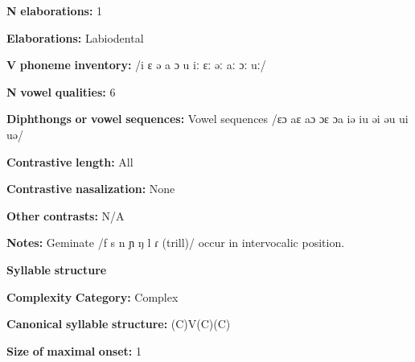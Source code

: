 \documentclass[output=paper]{langsci/langscibook}
\begin{document}
\begin{styleBody}
\textbf{N} \textbf{elaborations:} 1
\end{styleBody}

\begin{styleBody}
\textbf{Elaborations:} Labiodental
\end{styleBody}

\begin{styleBody}
\textbf{V} \textbf{phoneme} \textbf{inventory:} /i ɛ ə a ɔ u iː ɛː əː aː ɔː uː/
\end{styleBody}

\begin{styleBody}
\textbf{N} \textbf{vowel} \textbf{qualities:} 6
\end{styleBody}

\begin{styleBody}
\textbf{Diphthongs} \textbf{or} \textbf{vowel} \textbf{sequences:} Vowel sequences /ɛɔ aɛ aɔ ɔɛ ɔa iə iu əi əu ui uə/
\end{styleBody}

\begin{styleBody}
\textbf{Contrastive} \textbf{length:} All
\end{styleBody}

\begin{styleBody}
\textbf{Contrastive} \textbf{nasalization:} None
\end{styleBody}

\begin{styleBody}
\textbf{Other} \textbf{contrasts:} N/A
\end{styleBody}

\begin{styleBody}
\textbf{Notes:} Geminate /f s n ɲ ŋ l ɾ (trill)/ occur in intervocalic position.
\end{styleBody}

\begin{styleBody}
\textbf{Syllable} \textbf{structure}
\end{styleBody}

\begin{styleBody}
\textbf{Complexity} \textbf{Category:} Complex
\end{styleBody}

\begin{styleBody}
\textbf{Canonical} \textbf{syllable} \textbf{structure:} (C)V(C)(C) \citep[36-43]{Stirtz2011}
\end{styleBody}

\begin{styleBody}
\textbf{Size} \textbf{of} \textbf{maximal} \textbf{onset:} 1
\end{styleBody}
\end{document}
